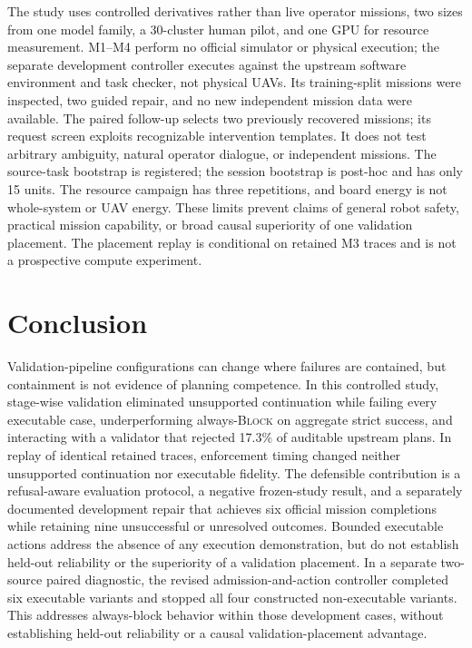 \documentclass{article}
\newcommand{\Mthree}{\textsc{M3}\xspace}
\begin{document}
The study uses controlled derivatives rather than live operator missions, two
sizes from one model family, a 30-cluster human pilot, and one GPU for resource
measurement. M1--M4 perform no official simulator or physical execution; the
separate development controller executes against the upstream software
environment and task checker, not physical UAVs. Its training-split missions
were inspected, two guided repair, and no new independent mission data were
available. The paired follow-up selects two previously recovered missions;
its request screen exploits recognizable intervention templates. It does not
test arbitrary ambiguity, natural operator dialogue, or independent missions. The
source-task bootstrap is registered; the session bootstrap is post-hoc and has
only 15 units. The resource campaign has three repetitions, and board energy is
not whole-system or UAV energy. These limits prevent claims of general robot
safety, practical mission capability, or broad causal superiority of one
validation placement. The placement replay is conditional on retained \Mthree
traces and is not a prospective compute experiment.

\section{Conclusion}

Validation-pipeline configurations can change where failures are contained,
but containment is not evidence of planning competence. In this controlled
study, stage-wise validation eliminated unsupported continuation while failing
every executable case, underperforming always-\textsc{Block} on aggregate strict
success, and interacting with a validator that rejected 17.3\% of auditable
upstream plans. In replay of identical retained traces, enforcement timing
changed neither unsupported continuation nor executable fidelity. The
defensible contribution is a refusal-aware evaluation protocol, a negative
frozen-study result, and a separately documented development repair that
achieves six official mission completions while retaining nine unsuccessful
or unresolved outcomes. Bounded executable actions address the absence of
any execution demonstration, but do not establish held-out reliability or
the superiority of a validation placement.
In a separate two-source paired diagnostic, the revised admission-and-action
controller completed six executable variants and stopped all four constructed
non-executable variants. This addresses always-block behavior within those
development cases, without establishing held-out reliability or a causal
validation-placement advantage.
\end{document}

